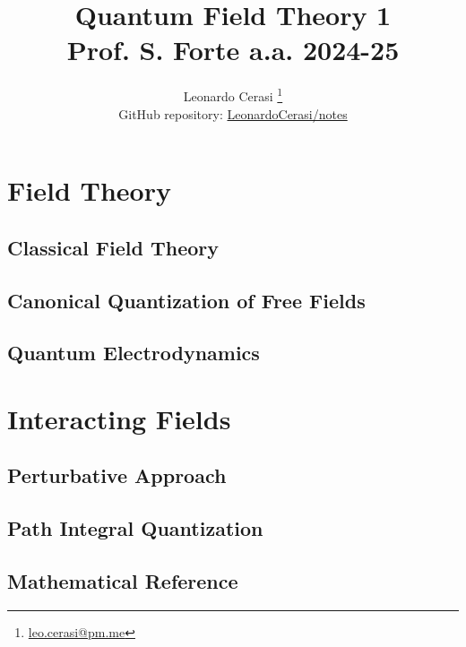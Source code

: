 \documentclass[a4paper, 12pt]{book}
\title{\Huge\textbf{Quantum Field Theory 1} \\ \large Prof. S. Forte a.a. 2024-25}
\author{Leonardo Cerasi%
	\thanks{\scriptsize\href{mailto:leonardo.cerasi@studenti.unimi.it}{leo.cerasi@pm.me}}\\
	\small GitHub repository: \href{https://github.com/LeonardoCerasi/notes}{LeonardoCerasi/notes}}
\begin{document}
\frontmatter

\maketitle

\tableofcontents

\pagestyle{contents}

\mainmatter

\part{Field Theory}
\pagestyle{body}

\chapter{Classical Field Theory}


\chapter{Canonical Quantization of Free Fields}


\chapter{Quantum Electrodynamics}


\part{Interacting Fields}
\pagestyle{body}

\chapter{Perturbative Approach}


\chapter{Path Integral Quantization}


\begin{appendices}
\pagestyle{append}

\chapter{Mathematical Reference}


\clearpage
\end{appendices}

\pagestyle{biblio}
\printbibliography[heading = bibintoc, title = {Bibliography}]
\end{document}
